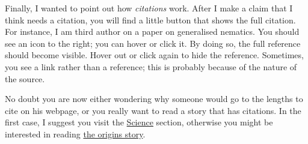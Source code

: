 \begin{multicols}{2}
Finally, I wanted to point out how \emph{citations} work. After I make a claim that I think needs a citation, you will find a little button
that shows the full citation. For instance, I am third author on a paper on generalised nematics. You should see an icon to the right;
you can hover or click it. By doing so, the full reference should become visible. Hover out or click again to hide the reference. Sometimes, you
see a link rather than a reference; this is probably because of the nature of the source.

No doubt you are now either wondering why someone would go to the lengths to cite on his webpage, or you really want to read a story that has
citations. In the first case, I suggest you visit the \href{./science}{Science} section, otherwise you might be interested in reading
\href{./origins}{the origins story}.
\end{multicols}
